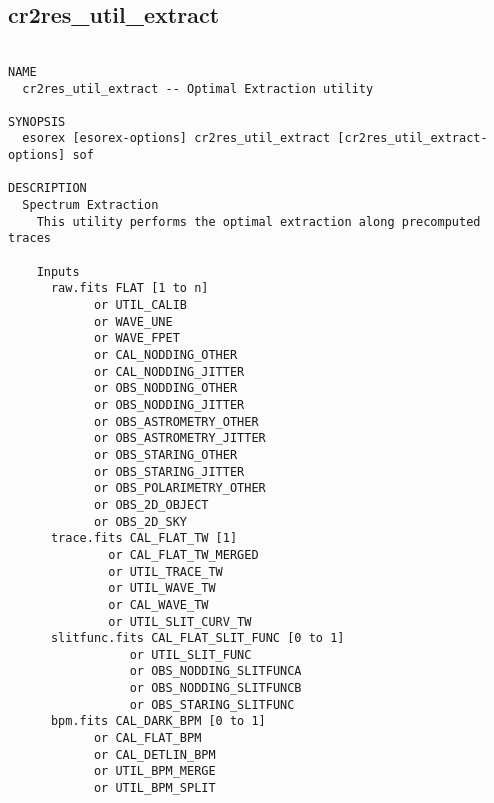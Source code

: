 \subsection{cr2res\_util\_extract}
\begin{verbatim}

NAME
  cr2res_util_extract -- Optimal Extraction utility

SYNOPSIS
  esorex [esorex-options] cr2res_util_extract [cr2res_util_extract-options] sof

DESCRIPTION
  Spectrum Extraction                                                     
    This utility performs the optimal extraction along precomputed traces 
                                                                          
    Inputs                                                                
      raw.fits FLAT [1 to n]                               
            or UTIL_CALIB                              
            or WAVE_UNE                                    
            or WAVE_FPET                                   
            or CAL_NODDING_OTHER                           
            or CAL_NODDING_JITTER                           
            or OBS_NODDING_OTHER                            
            or OBS_NODDING_JITTER                           
            or OBS_ASTROMETRY_OTHER                         
            or OBS_ASTROMETRY_JITTER                        
            or OBS_STARING_OTHER                            
            or OBS_STARING_JITTER                           
            or OBS_POLARIMETRY_OTHER                        
            or OBS_2D_OBJECT                                
            or OBS_2D_SKY                                   
      trace.fits CAL_FLAT_TW [1]                       
              or CAL_FLAT_TW_MERGED                    
              or UTIL_TRACE_TW                         
              or UTIL_WAVE_TW                          
              or CAL_WAVE_TW                           
              or UTIL_SLIT_CURV_TW                     
      slitfunc.fits CAL_FLAT_SLIT_FUNC [0 to 1]        
                 or UTIL_SLIT_FUNC                     
                 or OBS_NODDING_SLITFUNCA              
                 or OBS_NODDING_SLITFUNCB              
                 or OBS_STARING_SLITFUNC               
      bpm.fits CAL_DARK_BPM [0 to 1]                   
            or CAL_FLAT_BPM                            
            or CAL_DETLIN_BPM                          
            or UTIL_BPM_MERGE                          
            or UTIL_BPM_SPLIT                          
                                                                          

\end{verbatim}
